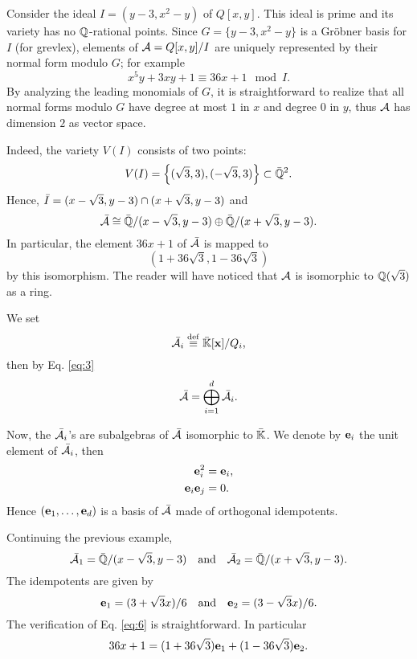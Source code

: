 \begin{example}
  Consider the ideal $I=(y-3,x^2-y)$ of $Q[x,y]$. This ideal is prime
  and its variety has no $\mathbb{Q}$-rational points. Since $G=\{y-3,x^2-y\}$
  is a Gröbner basis for $I$ (for grevlex), elements of
  $\mathcal{A}=Q[x,y]/I$ are uniquely represented by their normal form
  modulo $G$; for example
  \[x^5y + 3xy + 1 \equiv 36x + 1 \mod I\text{.}\] By analyzing the
  leading monomials of $G$, it is straightforward to realize that all
  normal forms modulo $G$ have degree at most $1$ in $x$ and degree
  $0$ in $y$, thus $\mathcal{A}$ has dimension $2$ as vector space.

  Indeed, the variety $V(I)$ consists of two points:
  \[V(I)=\left\{(\sqrt{3},3), (-\sqrt{3},3)\right\}\subset\bar{\mathbb{Q}}^2\text{.}\]
  Hence, $\bar{I}=(x-\sqrt{3},y-3)\cap(x+\sqrt{3},y-3)$ and
  \[\bar{\mathcal{A}}\cong \bar{\mathbb{Q}}/(x-\sqrt{3},y-3) \oplus
  \bar{\mathbb{Q}}/(x+\sqrt{3},y-3)\text{.}\] In particular, the element
  $36x+1$ of $\bar{\mathcal{A}}$ is mapped to
  \[(1+36\sqrt{3},1-36\sqrt{3})\] by this isomorphism. The reader will
  have noticed that $\mathcal{A}$ is isomorphic to $\mathbb{Q}(\sqrt{3})$ as a ring.
\end{example}

We set 
\begin{equation}
  \label{eq:4}
  \bar{\mathcal{A}}_i\overset{\mathrm{def}}{\equiv} \bar{\mathbb{K}}[\mathbf{x}]/Q_i
  \text{,}
\end{equation}
then by Eq. \eqref{eq:3} 
\begin{equation}
  \label{eq:5}
  \bar{\mathcal{A}} = \bigoplus_{i=1}^d\bar{\mathcal{A}_i}
  \text{.}
\end{equation}

Now, the $\bar{\mathcal{A}}_i$'s are subalgebras of $\bar{\mathcal{A}}$
isomorphic to $\bar{\mathbb{K}}$. We denote by $\mathbf{e}_i$ the unit element
of $\bar{\mathcal{A}}_i$, then
\begin{equation}
  \label{eq:6}
  \begin{aligned}
    \mathbf{e}_i^2 &= \mathbf{e}_i\text{,}\\
    \mathbf{e}_i\mathbf{e}_j &= 0\text{.}
  \end{aligned}
\end{equation}
Hence $(\mathbf{e}_1,\ldots,\mathbf{e}_d)$ is a basis of
$\bar{\mathcal{A}}$ made of orthogonal idempotents.

\begin{example}
  Continuing the previous example, 
  \[\bar{\mathcal{A}}_1 = \bar{\mathbb{Q}}/(x-\sqrt{3},y-3)
  \quad\text{and}\quad
  \bar{\mathcal{A}}_2 = \bar{\mathbb{Q}}/(x+\sqrt{3},y-3)
  \text{.}\]
  The idempotents are given by
  \[\mathbf{e}_1 = (3+\sqrt{3}x)/6
  \quad\text{and}\quad \mathbf{e}_2 = (3-\sqrt{3}x)/6 \text{.}\] The
  verification of Eq. \eqref{eq:6} is straightforward. In particular
  \[36x + 1 = (1+36\sqrt{3})\mathbf{e}_1 + (1-36\sqrt{3})\mathbf{e}_2
  \text{.}\]
\end{example}

